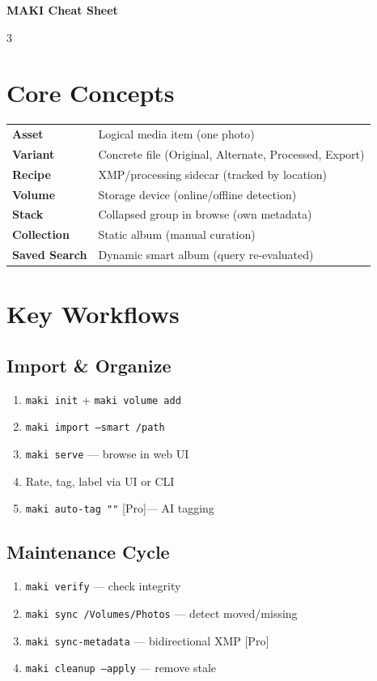 \documentclass[a4paper,landscape,8pt]{article}
\newcommand{\cmd}[1]{\texttt{\footnotesize #1}}
\newcommand{\pro}{\textcolor{maki-teal}{\scriptsize [Pro]}}
\begin{document}
\begin{center}
{\Large\bfseries\color{maki-salmon} MAKI Cheat Sheet} 
\end{center}
\vspace{-4pt}

\renewcommand{\arraystretch}{1.1}
\begin{multicols}{3}

\section{Core Concepts}
\begin{tabularx}{\columnwidth}{@{}lX@{}}
\textbf{Asset} & Logical media item (one photo) \\
\textbf{Variant} & Concrete file (Original, Alternate, Processed, Export) \\
\textbf{Recipe} & XMP/processing sidecar (tracked by location) \\
\textbf{Volume} & Storage device (online/offline detection) \\
\textbf{Stack} & Collapsed group in browse (own metadata) \\
\textbf{Collection} & Static album (manual curation) \\
\textbf{Saved Search} & Dynamic smart album (query re-evaluated) \\
\end{tabularx}

\section{Key Workflows}

\subsection{Import \& Organize}
\begin{enumerate}[leftmargin=1.5em]
\item \cmd{maki init} + \cmd{maki volume add}
\item \cmd{maki import --smart /path}
\item \cmd{maki serve} — browse in web UI
\item Rate, tag, label via UI or CLI
\item \cmd{maki auto-tag ""} \pro — AI tagging
\end{enumerate}

\subsection{Maintenance Cycle}
\begin{enumerate}[leftmargin=1.5em]
\item \cmd{maki verify} — check integrity
\item \cmd{maki sync /Volumes/Photos} — detect moved/missing
\item \cmd{maki sync-metadata} — bidirectional XMP \pro
\item \cmd{maki cleanup --apply} — remove stale
\end{enumerate}


\end{multicols}
\end{document}
